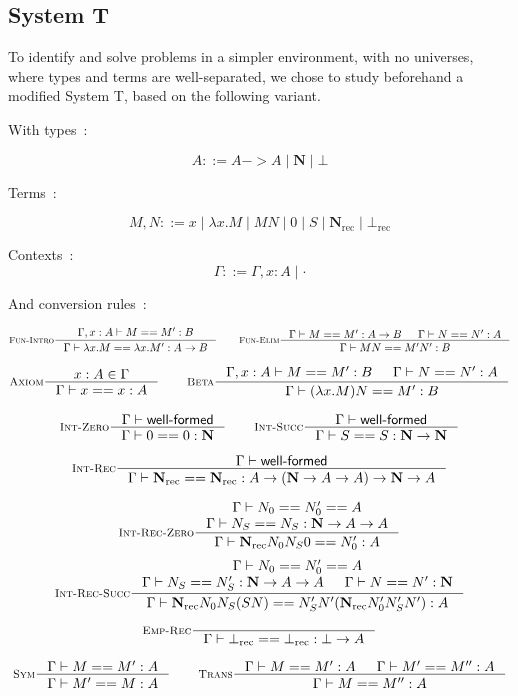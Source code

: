 \documentclass[11pt]{article}
\DeclareMathOperator{\rec}{rec}
\newcommand{\0}{\mathbf{0}}
\newcommand{\1}{\mathbf{1}}
\newcommand{\nat}{\mathbf{N}}
\newcommand{\tctx}{\Gamma}
\newcommand{\Wf}{\textsf{well-formed}}
\begin{document}
\subsection{System T}

To identify and solve problems in a simpler environment, with no universes, where types and terms are well-separated, we chose to study beforehand a modified System T, based on the following variant.

With types~:

$$ A ::= A -> A \mid \nat \mid \bot $$

Terms~:

$$ M,N ::= x \mid \lambda x. M \mid MN \mid 0 \mid S \mid \nat_{\rec} \mid \bot_{\rec} $$


Contexts~:
$$ \tctx ::= \tctx, x : A \mid \cdot $$

And conversion rules~:


$$
    \inference[\textsc{Fun-Intro}]{\tctx, x : A |- M == M' : B }{\tctx |- \lambda x. M == \lambda x. M' : A -> B} \qquad
    \inference[\textsc{Fun-Elim}]{\tctx |- M == M' : A -> B& \tctx |- N == N' : A}{\tctx |- MN == M'N' : B}
$$

$$
    \inference[\textsc{Axiom}]{x : A \in \tctx }{\tctx |- x == x : A} \qquad
    \inference[\textsc{Beta}]{\tctx, x : A |- M == M' : B & \tctx |- N == N' : A}{\tctx |- (\lambda x. M)N == M' : B}
$$

$$
    \inference[\textsc{Int-Zero}]{\tctx |- \Wf}{\tctx |- 0 == 0 : \nat} \qquad
    \inference[\textsc{Int-Succ}]{\tctx |- \Wf}{\tctx |- S == S : \nat -> \nat}
$$

$$
    \inference[\textsc{Int-Rec}]{\tctx |- \Wf}{\tctx |- \nat_{\rec} == \nat_{\rec} : A \to \left(\nat -> A -> A \right) -> \nat -> A}
$$


$$
    \inference[\textsc{Int-Rec-Zero}]{\tctx |- N_0 == N'_0 == A\\ \tctx |- N_S == N_S : \nat -> A  -> A}{\tctx |- \nat_{\rec} N_0N_S0 == N'_0 : A}
$$
$$
    \inference[\textsc{Int-Rec-Succ}]{\tctx |- N_0 == N'_0 == A\\ \tctx |- N_S == N'_S : \nat -> A  -> A & \tctx |- N == N' :\nat}{\tctx |- \nat_{\rec} N_0N_S (S N) == N'_S N' (\nat_{\rec}N'_0 N'_S N') : A}
$$


$$
    \inference[\textsc{Emp-Rec}]{}{\tctx |- \bot_{\rec} == \bot_{\rec} : \bot -> A}
$$

$$
    \inference[\textsc{Sym}]{\tctx |- M == M' : A}{\tctx |- M' == M : A} \qquad
    \inference[\textsc{Trans}]
    {\tctx |- M == M' :A & \tctx |- M' == M'' : A}{\tctx |- M == M'' : A}
$$
\end{document}
